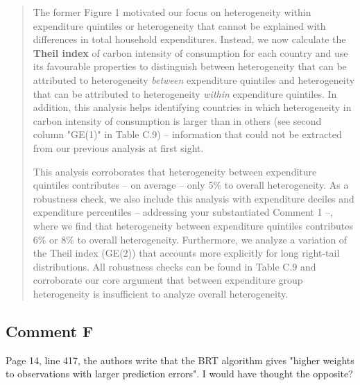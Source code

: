 \documentclass[11pt]{article}
\newenvironment{response}
{\begin{quote}\color{black}}
{\end{quote}}
\begin{document}
\begin{response}
The former Figure 1 motivated our focus on heterogeneity within expenditure quintiles or heterogeneity that cannot be explained with differences in total household expenditures. Instead, we now calculate the \textbf{Theil index} of carbon intensity of consumption for each country and use its favourable properties to distinguish between heterogeneity that can be attributed to heterogeneity \textit{between} expenditure quintiles and heterogeneity that can be attributed to heterogeneity \textit{within} expenditure quintiles. In addition, this analysis helps identifying countries in which heterogeneity in carbon intensity of consumption is larger than in others (see second column "GE(1)" in Table C.9) -- information that could not be extracted from our previous analysis at first sight.

This analysis corroborates that heterogeneity between expenditure quintiles contributes -- on average -- only 5\% to overall heterogeneity. As a robustness check, we also include this analysis with expenditure deciles and expenditure percentiles -- addressing your substantiated Comment 1 --, where we find that heterogeneity between expenditure quintiles contributes 6\% or 8\% to overall heterogeneity. Furthermore, we analyze a variation of the Theil index (GE(2)) that accounts more explicitly for long right-tail distributions. All robustness checks can be found in Table C.9 and corroborate our core argument that between expenditure group heterogeneity is insufficient to analyze overall heterogeneity.


\end{response}

\subsection*{Comment F}\label{comment_R1_F}

\begin{commentbox}
    Page 14, line 417, the authors write that the BRT algorithm gives "higher weights to observations with larger prediction errors". I would have thought the opposite?
\end{commentbox}
\end{document}
